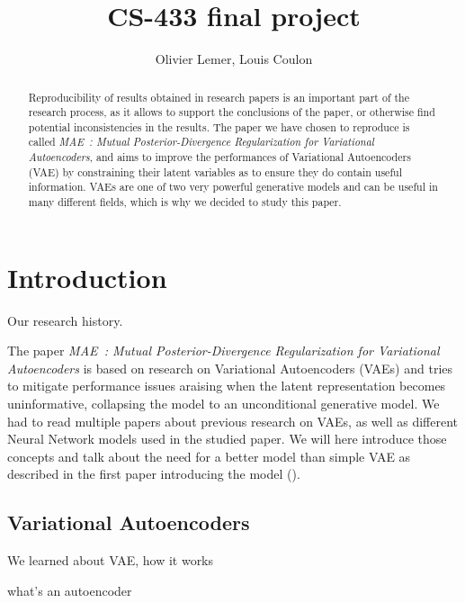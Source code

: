 \documentclass{article} %
\title{CS-433 final project}
\author{Olivier Lemer, Louis Coulon}
\begin{document}
\maketitle

\begin{abstract}
Reproducibility of results obtained in research papers is an important part of
the research process, as it allows to support the conclusions of the paper, or
otherwise find potential inconsistencies in the results. The paper we have
chosen to reproduce is called \textit{MAE~: Mutual Posterior-Divergence
  Regularization for Variational Autoencoders}, and aims to improve the
performances of Variational Autoencoders (VAE) by constraining their latent
variables as to ensure they do contain useful information. VAEs are one of two
very powerful generative models and can be useful in many different fields,
which is why we decided to study this paper.
\end{abstract}

\section {Introduction} %
Our research history.

The paper \textit{MAE~: Mutual Posterior-Divergence Regularization for Variational
Autoencoders} is based on research on Variational Autoencoders (VAEs) and tries
to mitigate performance issues araising when the latent representation becomes
uninformative, collapsing the model to an unconditional generative model. We had
to read multiple papers about previous research on VAEs, as well as different
Neural Network models used in the studied paper. We will here introduce those
concepts and talk about the need for a better model than simple VAE as described
in the first paper introducing the model (\citet{vae}).

\subsection {Variational Autoencoders}
We learned about VAE, how it works

what's an autoencoder
\end{document}

